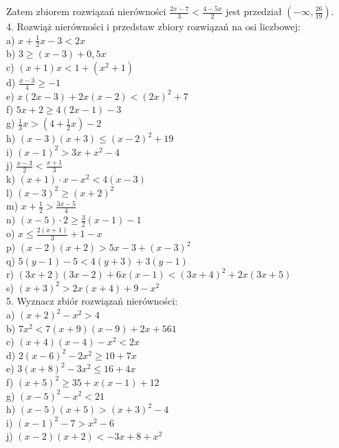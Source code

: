 \documentclass[10pt]{article}
\begin{document}
Zatem zbiorem rozwiązań nierówności \(\frac{2 x-7}{3}<\frac{4-5 x}{2}\) jest przedział \(\left(-\infty, \frac{26}{19}\right)\).\\
4. Rozwiąż nierówności i przedstaw zbiory rozwiązań na osi liczbowej:\\
a) \(x+\frac{1}{2} x-3<2 x\)\\
b) \(3 \geqslant(x-3)+0,5 x\)\\
c) \((x+1) x<1+\left(x^{2}+1\right)\)\\
d) \(\frac{x-3}{4} \geqslant-1\)\\
e) \(x(2 x-3)+2 x(x-2)<(2 x)^{2}+7\)\\
f) \(5 x+2 \geqslant 4(2 x-1)-3\)\\
g) \(\frac{1}{3} x>\left(4+\frac{1}{2} x\right)-2\)\\
h) \((x-3)(x+3) \leqslant(x-2)^{2}+19\)\\
i) \((x-1)^{2}>3 x+x^{2}-4\)\\
j) \(\frac{x-3}{2}<\frac{x+1}{3}\)\\
k) \((x+1) \cdot x-x^{2}<4(x-3)\)\\
l) \((x-3)^{2} \geqslant(x+2)^{2}\)\\
m) \(x+\frac{1}{2}>\frac{3 x-5}{4}\)\\
n) \((x-5) \cdot 2 \geqslant \frac{3}{2}(x-1)-1\)\\
o) \(x \leqslant \frac{2(x+1)}{3}+1-x\)\\
p) \((x-2)(x+2)>5 x-3+(x-3)^{2}\)\\
q) \(5(y-1)-5<4(y+3)+3(y-1)\)\\
r) \((3 x+2)(3 x-2)+6 x(x-1)<(3 x+4)^{2}+2 x(3 x+5)\)\\
s) \((x+3)^{2}>2 x(x+4)+9-x^{2}\)\\
5. Wyznacz zbiór rozwiązań nierówności:\\
a) \((x+2)^{2}-x^{2}>4\)\\
b) \(7 x^{2}<7(x+9)(x-9)+2 x+561\)\\
c) \((x+4)(x-4)-x^{2}<2 x\)\\
d) \(2(x-6)^{2}-2 x^{2} \geqslant 10+7 x\)\\
e) \(3(x+8)^{2}-3 x^{2} \leqslant 16+4 x\)\\
f) \((x+5)^{2} \geqslant 35+x(x-1)+12\)\\
g) \((x-5)^{2}-x^{2}<21\)\\
h) \((x-5)(x+5)>(x+3)^{2}-4\)\\
i) \((x-1)^{2}-7>x^{2}-6\)\\
j) \((x-2)(x+2)<-3 x+8+x^{2}\)\\
\end{document}
